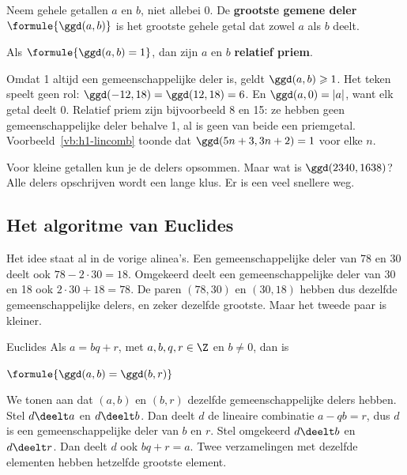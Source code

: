 \begin{theorie}
Neem gehele getallen $a$ en $b$, niet allebei 0. De \textbf{\textcolor{accent}{grootste gemene deler}} $\formule{\ggd(a, b)}$ is het grootste gehele getal dat zowel $a$ als $b$ deelt.

\vspace{1mm}
Als $\formule{\ggd(a, b) = 1}$, dan zijn $a$ en $b$ \textbf{\textcolor{accent}{relatief priem}}.
\end{theorie}

Omdat 1 altijd een gemeenschappelijke deler is, geldt $\ggd(a, b) \geqslant 1$. Het teken speelt geen rol: $\ggd(-12, 18) = \ggd(12, 18) = 6$. En $\ggd(a, 0) = |a|$, want elk getal deelt 0. Relatief priem zijn bijvoorbeeld 8 en 15: ze hebben geen gemeenschappelijke deler behalve 1, al is geen van beide een priemgetal. Voorbeeld~\ref{vb:h1-lincomb} toonde dat $\ggd(5n + 3, 3n + 2) = 1$ voor elke $n$.

Voor kleine getallen kun je de delers opsommen. Maar wat is $\ggd(2340, 1638)$? Alle delers opschrijven wordt een lange klus. Er is een veel snellere weg.

\subsection{Het algoritme van Euclides}

Het idee staat al in de vorige alinea's. Een gemeenschappelijke deler van 78 en 30 deelt ook $78 - 2 \cdot 30 = 18$. Omgekeerd deelt een gemeenschappelijke deler van 30 en 18 ook $2 \cdot 30 + 18 = 78$. De paren $(78, 30)$ en $(30, 18)$ hebben dus dezelfde gemeenschappelijke delers, en zeker dezelfde grootste. Maar het tweede paar is kleiner.

\begin{theorie}
\begin{stelling}{Euclides}
Als $a = bq + r$, met $a, b, q, r \in \Z$ en $b \neq 0$, dan is

\vspace{1mm}
\qquad $\formule{\ggd(a, b) = \ggd(b, r)}$
\end{stelling}

\begin{bewijs}
We tonen aan dat $(a, b)$ en $(b, r)$ dezelfde gemeenschappelijke delers hebben. Stel $d \deelt a$ en $d \deelt b$. Dan deelt $d$ de lineaire combinatie $a - qb = r$, dus $d$ is een gemeenschappelijke deler van $b$ en $r$. Stel omgekeerd $d \deelt b$ en $d \deelt r$. Dan deelt $d$ ook $bq + r = a$. Twee verzamelingen met dezelfde elementen hebben hetzelfde grootste element.
\end{bewijs}
\end{theorie}

